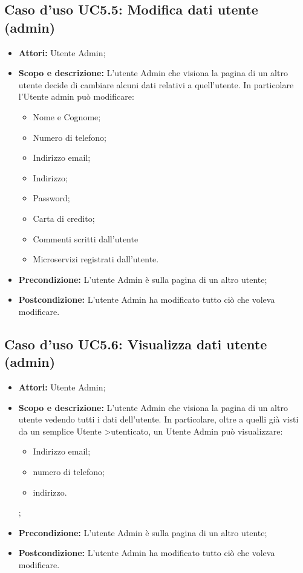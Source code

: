 \documentclass[12pt,a4paper,titlepage]{article}
\begin{document}
	\subsection{Caso d'uso UC5.5: Modifica dati utente (admin)}
	\label{UC5.5}
	\begin{itemize}
		\item \textbf{Attori: }Utente Admin;
		\item \textbf{Scopo e descrizione: }L'utente Admin che visiona la pagina di un altro utente decide di cambiare alcuni dati relativi a quell'utente. In particolare l'Utente admin può modificare:
		\begin{itemize}
			\item Nome e Cognome;
			\item Numero di telefono;
			\item Indirizzo email;
			\item Indirizzo;
			\item Password;
			\item Carta di credito;
			\item Commenti scritti dall'utente
			\item Microservizi registrati dall'utente.
		\end{itemize}
		\item \textbf{Precondizione: }L'utente Admin è sulla pagina di un altro utente;
		\item \textbf{Postcondizione: }L'utente Admin ha modificato tutto ciò che voleva modificare.
	\end{itemize}
	\subsection{Caso d'uso UC5.6: Visualizza dati utente (admin)}
	\label{UC5.6}
	\begin{itemize}
		\item \textbf{Attori: }Utente Admin;
		\item \textbf{Scopo e descrizione: }L'utente Admin che visiona la pagina di un altro utente vedendo tutti i dati dell'utente. In particolare, oltre a quelli già visti da un semplice Utente >utenticato, un Utente Admin può visualizzare:
		\begin{itemize}
			\item Indirizzo email;
			\item numero di telefono;
			\item indirizzo.
		\end{itemize};
		\item \textbf{Precondizione: }L'utente Admin è sulla pagina di un altro utente;
		\item \textbf{Postcondizione: }L'utente Admin ha modificato tutto ciò che voleva modificare.
	\end{itemize}
\end{document}
